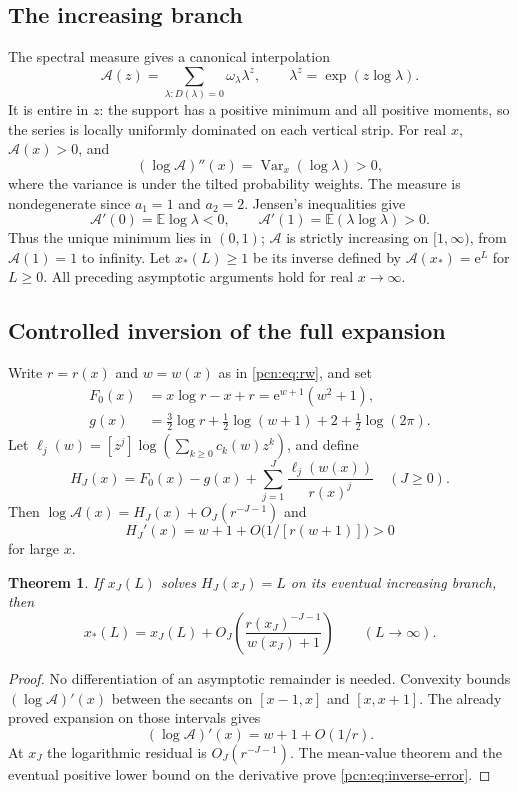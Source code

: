 \documentclass[11pt,letterpaper]{article}
\newtheorem{theorem}{Theorem}[section]
\theoremstyle{remark}\newtheorem{remark}[theorem]{Remark}
\newcommand{\E}{\mathbb E}
\newcommand{\ee}{\mathrm e}
\newcommand{\Var}{\operatorname{Var}}
\begin{document}
\subsection{The increasing branch}
The spectral measure gives a canonical interpolation
\begin{equation}\label{pcn:eq:interpolation}
 \mathcal A(z)=\sum_{\lambda:D(\lambda)=0}\omega_\lambda\lambda^z,
 \qquad \lambda^z=\exp(z\log\lambda).
\end{equation}
It is entire in $z$: the support has a positive minimum and all positive moments, so the series is locally uniformly dominated on each vertical strip. For real $x$, $\mathcal A(x)>0$, and
\[
 (\log\mathcal A)''(x)=\Var_x(\log\lambda)>0,
\]
where the variance is under the tilted probability weights. The measure is nondegenerate since $a_1=1$ and $a_2=2$. Jensen's inequalities give
\[
 \mathcal A'(0)=\E\log\lambda<0,\qquad
 \mathcal A'(1)=\E(\lambda\log\lambda)>0.
\]
Thus the unique minimum lies in $(0,1)$; $\mathcal A$ is strictly increasing on $[1,\infty)$, from $\mathcal A(1)=1$ to infinity. Let $x_*(L)\ge1$ be its inverse defined by $\mathcal A(x_*)=\ee^L$ for $L\ge0$. All preceding asymptotic arguments hold for real $x\to\infty$.

\subsection{Controlled inversion of the full expansion}
Write $r=r(x)$ and $w=w(x)$ as in \eqref{pcn:eq:rw}, and set
\begin{align}
 F_0(x)&=x\log r-x+r=\ee^{w+1}(w^2+1),\label{pcn:eq:F0}\\
 g(x)&=\frac32\log r+\frac12\log(w+1)+2+\frac12\log(2\pi).
\end{align}
Let $\ell_j(w)=[z^j]\log(\sum_{k\ge0}c_k(w)z^k)$, and define
\begin{equation}\label{pcn:eq:HJ}
 H_J(x)=F_0(x)-g(x)+\sum_{j=1}^J\frac{\ell_j(w(x))}{r(x)^j}\quad(J\ge0).
\end{equation}
Then $\log\mathcal A(x)=H_J(x)+O_J(r^{-J-1})$ and
\[
 H_J'(x)=w+1+O\bigl(1/[r(w+1)]\bigr)>0
\]
for large $x$.

\begin{theorem}\label{pcn:thm:inverse}
If $x_J(L)$ solves $H_J(x_J)=L$ on its eventual increasing branch, then
\begin{equation}\label{pcn:eq:inverse-error}
 x_*(L)=x_J(L)+O_J\left(\frac{r(x_J)^{-J-1}}{w(x_J)+1}\right)
       \qquad(L\to\infty).
\end{equation}
\end{theorem}
\begin{proof}
No differentiation of an asymptotic remainder is needed. Convexity bounds $(\log\mathcal A)'(x)$ between the secants on $[x-1,x]$ and $[x,x+1]$. The already proved expansion on those intervals gives
\[
 (\log\mathcal A)'(x)=w+1+O(1/r).
\]
At $x_J$ the logarithmic residual is $O_J(r^{-J-1})$. The mean-value theorem and the eventual positive lower bound on the derivative prove \eqref{pcn:eq:inverse-error}.
\end{proof}
\end{document}
